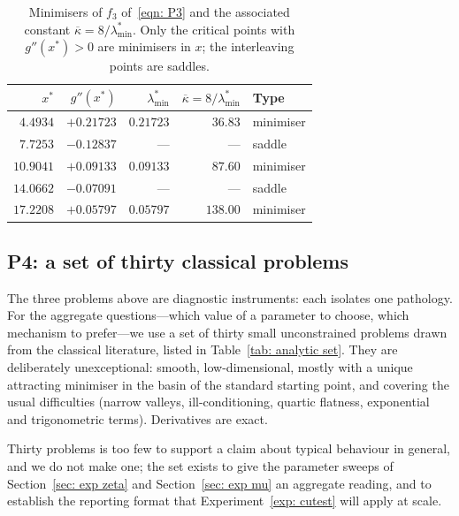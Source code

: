 \documentclass[11pt]{article}
\theoremstyle{plain}
\theoremstyle{definition}
\theoremstyle{remark}
\numberwithin{equation}{section}
\begin{document}
\begin{table}[htbp]
  \centering
  \caption{Minimisers of $f_3$ of~\eqref{eqn: P3} and the associated constant
           $\overline{\kappa} = 8/\lambda^*_{\min}$. Only the critical points with
           $g''(x^*) > 0$ are minimisers in $x$; the interleaving points are saddles.}
  \label{tab: P3 kappa}
  \small
  \begin{tabular}{rrrrl}
    \toprule
    $x^*$ & $g''(x^*)$ & $\lambda^*_{\min}$ & $\overline{\kappa} = 8/\lambda^*_{\min}$ & Type \\
    \midrule
    $4.4934$  & $+0.21723$ & $0.21723$ & $36.83$ & minimiser \\
    $7.7253$  & $-0.12837$ & ---       & ---     & saddle \\
    $10.9041$ & $+0.09133$ & $0.09133$ & $87.60$ & minimiser \\
    $14.0662$ & $-0.07091$ & ---       & ---     & saddle \\
    $17.2208$ & $+0.05797$ & $0.05797$ & $138.00$ & minimiser \\
    \bottomrule
  \end{tabular}
\end{table}

\subsection{P4: a set of thirty classical problems}
\label{sec: analytic set}

The three problems above are diagnostic instruments: each isolates one pathology. For the
aggregate questions---which value of a parameter to choose, which mechanism to prefer---we use a
set of thirty small unconstrained problems drawn from the classical literature, listed in
Table~\ref{tab: analytic set}. They are deliberately unexceptional: smooth, low-dimensional,
mostly with a unique attracting minimiser in the basin of the standard starting point, and
covering the usual difficulties (narrow valleys, ill-conditioning, quartic flatness, exponential
and trigonometric terms). Derivatives are exact.

Thirty problems is too few to support a claim about typical behaviour in general, and we do not
make one; the set exists to give the parameter sweeps of Section~\ref{sec: exp zeta} and
Section~\ref{sec: exp mu} an aggregate reading, and to establish the reporting format that
Experiment~\ref{exp: cutest} will apply at scale.
\end{document}
